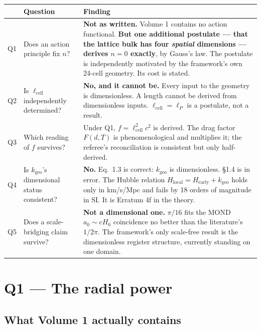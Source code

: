 \documentclass[11pt,letterpaper]{article}
\newcommand{\kgeo}{k_{\mathrm{geo}}}
\newcommand{\lcell}{\ell_{\mathrm{cell}}}
\newcommand{\lP}{\ell_{P}}
\begin{document}
\begin{center}
\small
\begin{tabular}{@{}clp{}@{}}
\toprule
& \textbf{Question} & \textbf{Finding} \\
\midrule
Q1 & Does an action principle fix $n$? &
\textbf{Not as written.} Volume 1 contains no action functional. \textbf{But one additional
postulate --- that the lattice bulk has four \emph{spatial} dimensions --- derives $n=0$
exactly}, by Gauss's law. The postulate is independently motivated by the framework's own
24-cell geometry. Its cost is stated. \\
\addlinespace
Q2 & Is $\lcell$ independently determined? &
\textbf{No, and it cannot be.} Every input to the geometry is dimensionless. A length cannot
be derived from dimensionless inputs. $\lcell = \lP$ is a postulate, not a result. \\
\addlinespace
Q3 & Which reading of $f$ survives? &
Under Q1, $f = \lcell^2 c^2$ is derived. The drag factor $F(d,T)$ is phenomenological and
multiplies it; the referee's reconciliation is consistent but only half-derived. \\
\addlinespace
Q4 & Is $\kgeo$'s dimensional status consistent? &
\textbf{No.} Eq.~1.3 is correct: $\kgeo$ is dimensionless. \S1.4 is in error. The Hubble
relation $H_{\mathrm{local}} = H_{\mathrm{early}} + \kgeo$ holds only in km/s/Mpc and fails
by 18 orders of magnitude in SI. It is Erratum 4f in the theory. \\
\addlinespace
Q5 & Does a scale-bridging claim survive? &
\textbf{Not a dimensional one.} $\pi/16$ fits the MOND $a_0 \sim cH_0$ coincidence no better
than the literature's $1/2\pi$. The framework's only scale-free result is the dimensionless
register structure, currently standing on one domain. \\
\bottomrule
\end{tabular}
\end{center}

\section{Q1 --- The radial power}

\subsection{What Volume 1 actually contains}
\end{document}
